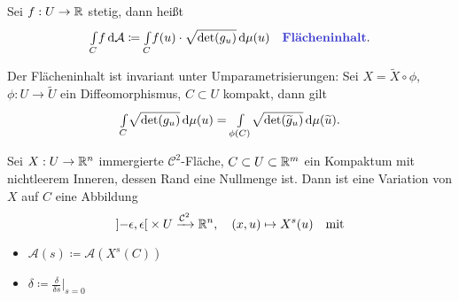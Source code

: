 \documentclass{cheat-sheet}
\newcommand{\A}{\mathcal{A}}
\begin{document}



\begin{defn}
  Sei $f : U \to \mathbb{R}$ stetig, dann heißt
  \[ \Int{C}{}{f}{\A} \coloneqq \Int{C}{}{f(u) \cdot \sqrt{\det(g_u)}}{\mu (u)} \quad \text{\emph{Flächeninhalt}.} \]
\end{defn}

\begin{prop}
  Der Flächeninhalt ist invariant unter Umparametrisierungen: Sei $X = \widetilde{X} \circ \phi$, $\phi : U \to \widetilde{U}$ ein Diffeomorphismus, $C \subset U$ kompakt, dann gilt
  \[ {\textstyle \int\limits_{C}^{}} \sqrt{\det(g_u)} \,\mathrm{d} \mu (u) = {\textstyle \int\limits_{\phi(C)}^{}} \sqrt{\det(\widetilde{g}_u)} \,\mathrm{d} \mu (\widetilde{u}). \]
\end{prop}



\begin{defn}
  Sei $X : U \to \mathbb{R}^n$ immergierte $\mathcal{C}^2$-Fläche,
  $C \subset U \subset \mathbb{R}^m$ ein Kompaktum mit nichtleerem Inneren, dessen Rand eine Nullmenge ist.
  Dann ist eine Variation von $X$ auf $C$ eine Abbildung
  \[
    \left] -\epsilon, \epsilon \right[ \times U \xrightarrow{\mathcal{C}^2} \mathbb{R}^n, \quad
    (x, u) \mapsto X^s(u) \quad \text{mit}
  \]
  \begin{itemize}
  \end{itemize}
\end{defn}

\begin{nota}
  \begin{multicols}{2}
    \begin{itemize}
      \item $\A(s) \coloneqq \A(X^s(C))$
      \item $\delta \coloneqq \tfrac{\delta}{\delta s}|_{s = 0}$
    \end{itemize}
  \end{multicols}
\end{nota}
\end{document}
